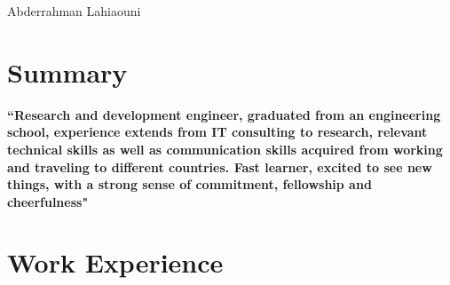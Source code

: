 \documentclass[10pt]{article} %
\begin{document}
\begin{paracol}{2} %


\parbox[top][0.06\textheight][c]{\linewidth}{ %
	\vspace{-0.04\textheight} %
	\centering %
	{\sffamily\Huge Abderrahman Lahiaouni}\\\medskip %
}




\section{Summary}

{\raggedright\textbf{``Research and development engineer, graduated from an engineering school, experience extends from IT consulting to research, relevant technical skills as well as communication skills acquired from working and traveling to different countries. Fast learner, excited to see new things, with a strong sense of commitment, fellowship and cheerfulness"} \medskip}


\medskip %


\section{Work Experience}




\end{paracol}
\end{document}
